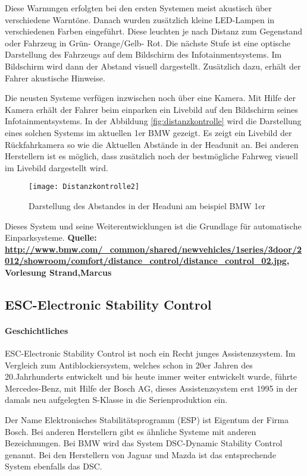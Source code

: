 Diese Warnungen erfolgten bei den ersten Systemen meist akustisch über verschiedene Warntöne. Danach wurden zusätzlich kleine LED-Lampen in verschiedenen Farben eingeführt. Diese leuchten je nach Distanz zum Gegenstand oder Fahrzeug in Grün- Orange/Gelb- Rot. Die nächste Stufe ist eine optische Darstellung des Fahrzeugs auf dem Bildschirm des Infotainmentsystems. Im Bildschirm wird dann der Abstand visuell dargestellt. Zusätzlich dazu, erhält der Fahrer akustische Hinweise. 

Die neusten Systeme verfügen inzwischen noch über eine Kamera. Mit Hilfe der Kamera erhält der Fahrer beim einparken ein Livebild auf den Bildschirm seines Infotainmentsystems. In der Abbildung \vref{fig:distanzkontrolle} wird die Darstellung eines solchen Systems im aktuellen 1er BMW gezeigt. Es zeigt ein Livebild der Rückfahrkamera so wie die Aktuellen Abstände in der Headunit an. Bei anderen Herstellern ist es möglich, dass zusätzlich noch der bestmögliche Fahrweg visuell im Livebild dargestellt wird.
\begin{figure}[htb]
\centering
\texttt{[image: Distanzkontrolle2]}
\caption{Darstellung des Abstandes in der Headuni am beispiel BMW 1er}
\label{fig:distanzkontrolle}
\end{figure}

Dieses System und seine Weiterentwicklungen ist die Grundlage für automatische Einparksysteme. 
\textbf{Quelle: \url{http://www.bmw.com/_common/shared/newvehicles/1series/3door/2012/showroom/comfort/distance_control/distance_control_02.jpg}, Vorlesung Strand,Marcus}
\subsection{ESC-Electronic Stability Control} 
\paragraph{Geschichtliches} ESC-Electronic Stability Control ist noch ein Recht junges Assistenzsystem. Im Vergleich zum Antiblockiersystem, welches schon in 20er Jahren des 20.Jahrhunderts entwickelt und bis heute immer weiter entwickelt wurde, führte Mercedes-Benz, mit Hilfe der Bosch AG, dieses Assistenzsystem erst 1995 in der damals neu aufgelegten S-Klasse in die Serienproduktion ein. 

Der Name Elektronisches Stabilitätsprogramm (ESP) ist Eigentum der Firma Bosch. Bei anderen Herstellern gibt es ähnliche Systeme mit anderen Bezeichnungen. Bei BMW wird das System DSC-Dynamic Stability Control genannt. Bei den Herstellern von Jaguar und Mazda ist das entsprechende System ebenfalls das DSC.

